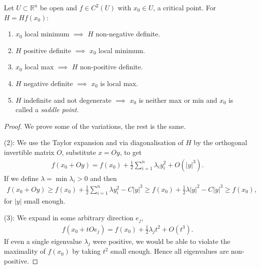 \begin{prop}\label{prop:hess-crit-points}
	Let $U \subset \mathbb{R}^{n}$ be open and $f \in C^{2}(U)$ with $x_{0} \in U$, a critical point. For $H = Hf(x_{0})$:
	\begin{enumerate}
		\item $x_{0}$ local minimum $\implies$ $H$ non-negative definite.
		\item $H$ positive definite $\implies$ $x_{0}$ local minimum.
		\item $x_{0}$ local max $\implies$ $H$ non-positive definite.
		\item $H$ negative definite $\implies$ $x_{0}$ is local max.
		\item $H$ indefinite and not degenerate $\implies$ $x_{0}$ is neither max or min and $x_{0}$ is called a \textit{saddle point}.
	\end{enumerate}
\end{prop}
\begin{proof}
	We prove some of the variations, the rest is the same.

	(2): We use the Taylor expansion and via diagonalisation of $H$ by the orthogonal invertible matrix $O$, substitute $x = Oy$, to get
	\begin{align*}
		f(x_{0} + O y) = f(x_{0}) + \frac{1}{2} \sum_{i=1}^{n}  \lambda_{i} y_{i}^{2} + O(\left| y \right|^{3}).
	\end{align*}
	If we define $\lambda = \min \lambda_{i} > 0$ and then
	\begin{align*}
		f(x_{0} + O y) \geq f(x_{0}) + \frac{1}{2} \sum_{i=1}^{n} \lambda y_{i}^{2} - C \left| y \right|^{3} \geq f(x_{0}) + \frac{1}{2}\lambda \left| y \right|^{2} - C\left| y \right|^{3} \geq f(x_{0}),
	\end{align*}
	for $\left| y \right|$ small enough.

	(3): We expand in some arbitrary direction $e_{j}$,
	\begin{align*}
		f(x_{0} + t O e_{j}) = f(x_{0}) + \frac{1}{2} \lambda_{j} t^{2} + O( t^{3}).
	\end{align*}
	If even a single eigenvalue $\lambda_{j}$ were positive, we would be able to violate the maximality of $f(x_{0})$ by taking $t^{2}$ small enough. Hence all eigenvalues are non-positive.
\end{proof}

